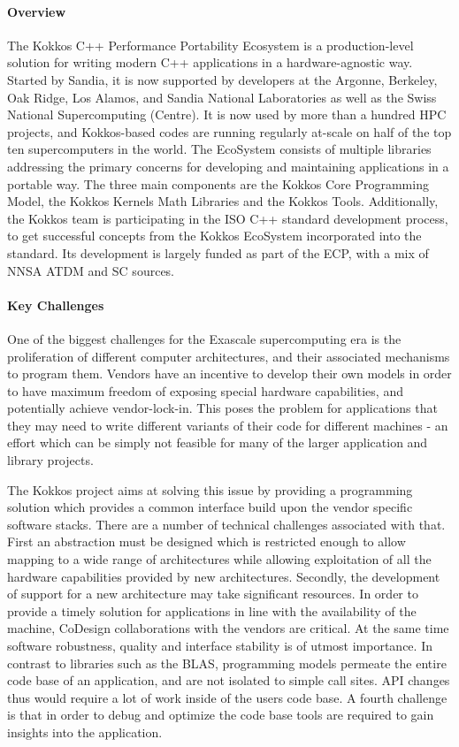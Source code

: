 \paragraph{Overview} 

The Kokkos C++ Performance Portability Ecosystem is a production-level solution for writing modern C++ applications in a hardware-agnostic way.
Started by Sandia, it is now supported by developers at the Argonne, Berkeley, Oak Ridge, Los Alamos, and Sandia National Laboratories as well as the Swiss National Supercomputing (Centre).
It is now used by more than a hundred HPC projects, and Kokkos-based codes are running regularly at-scale on half of the top ten supercomputers in the world. 
The EcoSystem consists of multiple libraries addressing the primary concerns for developing and maintaining applications in a portable way.
The three main components are the Kokkos Core Programming Model, the Kokkos Kernels Math Libraries and the Kokkos Tools.
Additionally, the Kokkos team is participating in the ISO C++ standard development process, to get successful concepts from the Kokkos EcoSystem incorporated into the standard. 
Its development is largely funded as part of the ECP, with a mix of NNSA ATDM and SC sources. 

 
\paragraph{Key Challenges}

One of the biggest challenges for the Exascale supercomputing era is the proliferation of different computer architectures, and their associated mechanisms to program them.
Vendors have an incentive to develop their own models in order to have maximum freedom of exposing special hardware capabilities, and potentially achieve vendor-lock-in.
This poses the problem for applications that they may need to write different variants of their code for different machines - an effort which can be simply not feasible for many of the larger application and library projects.

The Kokkos project aims at solving this issue by providing a programming solution which provides a common interface build upon the vendor specific software stacks.
There are a number of technical challenges associated with that. 
First an abstraction must be designed which is restricted enough to allow mapping to a wide range of architectures while allowing exploitation of all the hardware capabilities provided by new architectures. 
Secondly, the development of support for a new architecture may take significant resources. In order to provide a timely solution for applications in line with the availability of the machine, CoDesign collaborations with the vendors are critical.
At the same time software robustness, quality and interface stability is of utmost importance. 
In contrast to libraries such as the BLAS, programming models permeate the entire code base of an application, and are not isolated to simple call sites. 
API changes thus would require a lot of work inside of the users code base. 
A fourth challenge is that in order to debug and optimize the code base tools are required to gain insights into the application. 

